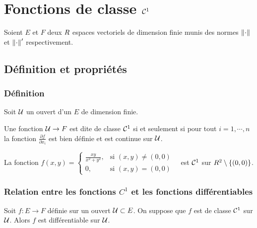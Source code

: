 \chapter{Fonctions de classe $\mathcal{C}^1$ %
}

Soient $E$ et $F$ deux $R$ espaces vectoriels de dimension finie munis des normes $\left\lVert\cdot\right\rVert$ et $\left\lVert\cdot\right\rVert'$ respectivement.

	\pl{\rep{6cm}}


\section{Définition et propriétés}

\subsection{Définition}

Soit $\mathcal{U}$ un ouvert d'un \rev{}  $E$ de dimension finie.
\begin{definition}
	Une fonction $\mathcal{U} \to F$ est dite de classe $\mathcal{C}^1$ si et seulement si pour tout $i=1,\cdots,n$ la fonction $\frac{\partial f}{\partial x_i}  $ est bien définie et est continue sur $\mathcal{U}$.
\end{definition}


\begin{exemple}
	La fonction	$f(x,y)= \begin{cases}\frac{xy}{x^2+y^2}, &\text{si $(x,y) \neq (0,0)$} \\ 0, & \text{si $(x,y) =(0,0)$ }\end{cases}$ est $\mathcal{C}^1$ sur $R^2 \setminus \left\{ (0,0) \right\}$.
	\pl{\rep{6cm}}
\end{exemple}


\subsection{Relation entre les fonctions $C^1$ et les fonctions différentiables}

\begin{theorem}
	Soit $f:E\to F$ définie sur un ouvert $\mathcal{U} \subset E$. On suppose que $f$ est de classe $\mathcal{C}^1$ sur $\mathcal{U}$. Alors $f$ est différentiable sur $\mathcal{U}$.
\end{theorem}

